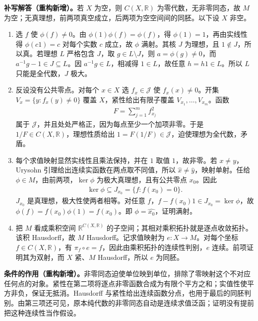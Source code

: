 \documentclass[../../main.tex]{subfiles}%
\begin{document}
\begin{solution}
\textbf{补写解答（重构新增）。}若 $X$ 为空，则 $C(X,\mathbb R)$ 为零代数，无非零同态，故 $M$ 为空；无真理想，前两项真空成立，后两项为空空间间的同胚。以下设 $X$ 非空。
\begin{enumerate}
\item 选 $f$ 使 $\phi(f)\ne0$。由 $\phi(1)\phi(f)=\phi(f)$，得 $\phi(1)=1$，再由实线性得 $\phi(c1)=c$ 对每个实数 $c$ 成立，故 $\phi$ 满射。其核 $J$ 为理想，且 $1\notin J$，所以真。若理想 $L$ 严格包含 $J$，取 $g\in L\setminus J$，则 $a=\phi(g)\ne0$，而 $a^{-1}g-1\in J\subseteq L$。因 $a^{-1}g\in L$，相减得 $1\in L$，故任意 $h=h1\in L$。所以 $L$ 只能是全代数，$J$ 极大。
\item 反设没有公共零点。对每个 $x\in X$ 选 $f_x\in\mathcal J$ 使 $f_x(x)\ne0$。开集 $V_x=\{y:f_x(y)\ne0\}$ 覆盖 $X$，紧性给出有限子覆盖 $V_{x_1},\ldots,V_{x_m}$。函数
\begin{align*}
F=\sum_{j=1}^m f_{x_j}^2
\end{align*}
属于 $\mathcal J$，并且处处严格正，因为每点至少一个加项非零。于是 $1/F\in C(X,\mathbb R)$，理想性质给出 $1=F(1/F)\in\mathcal J$，迫使理想为全代数，矛盾。
\item 每个求值映射显然实线性且乘法保持，并在 $1$ 取值 $1$，故非零。若 $x\ne y$，Urysohn 引理给出连续实函数在两点取不同值，所以 $\widehat x\ne\widehat y$，映射单射。任给 $\phi\in M$，由前两项，$\ker\phi$ 为极大真理想，且有公共零点 $x_0$。因此
\begin{align*}
\ker\phi\subseteq J_{x_0}=\{f:f(x_0)=0\}.
\end{align*}
$J_{x_0}$ 是真理想，极大性使两者相等。对任意 $f$，$f-f(x_0)1\in J_{x_0}=\ker\phi$，故 $\phi(f)=f(x_0)\phi(1)=f(x_0)$。即 $\phi=\widehat{x_0}$，证明满射。
\item 把 $M$ 看成乘积空间 $\mathbb R^{C(X,\mathbb R)}$ 的子空间；其相对乘积拓扑就是逐点收敛拓扑。该积 Hausdorff，故 $M$ Hausdorff。记求值映射为 $e:X\to M$。对每个坐标 $f\in C(X,\mathbb R)$，有 $\pi_f\circ e=f$，因此由乘积拓扑的连续性判别，$e$ 连续。前项证明其为双射，而 $X$ 紧、$M$ Hausdorff，所以 $e$ 为同胚。
\end{enumerate}
\end{solution}
\begin{remark}
\textbf{条件的作用（重构新增）。}非零同态迫使单位映到单位，排除了零映射这个不对应任何点的对象。紧性在第二项将逐点非零函数合成为有限个平方之和；实值性使平方非负，保证无抵消。Hausdorff 与紧性给出连续函数分点，也用于最后的同胚判别。由第三项还可见，原本纯代数的非零同态自动是连续求值泛函；证明没有提前把这种连续性当作假设。
\end{remark}
\end{document}
